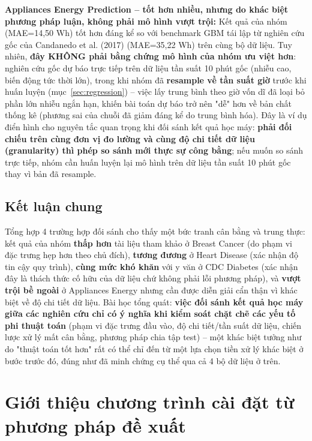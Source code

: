 \textbf{Appliances Energy Prediction -- tốt hơn nhiều, nhưng do khác biệt phương pháp luận, không phải mô hình vượt trội:} Kết quả của nhóm (MAE=14,50 Wh) tốt hơn đáng kể so với benchmark GBM tái lập từ nghiên cứu gốc của Candanedo et al. (2017) (MAE=35,22 Wh) trên cùng bộ dữ liệu. Tuy nhiên, \textbf{đây KHÔNG phải bằng chứng mô hình của nhóm ưu việt hơn}: nghiên cứu gốc dự báo trực tiếp trên dữ liệu tần suất 10 phút gốc (nhiễu cao, biến động tức thời lớn), trong khi nhóm đã \textbf{resample về tần suất giờ} trước khi huấn luyện (mục~\ref{sec:regression}) -- việc lấy trung bình theo giờ vốn dĩ đã loại bỏ phần lớn nhiễu ngắn hạn, khiến bài toán dự báo trở nên "dễ" hơn về bản chất thống kê (phương sai của chuỗi đã giảm đáng kể do trung bình hóa). Đây là ví dụ điển hình cho nguyên tắc quan trọng khi đối sánh kết quả học máy: \textbf{phải đối chiếu trên cùng đơn vị đo lường và cùng độ chi tiết dữ liệu (granularity) thì phép so sánh mới thực sự công bằng}; nếu muốn so sánh trực tiếp, nhóm cần huấn luyện lại mô hình trên dữ liệu tần suất 10 phút gốc thay vì bản đã resample.

\subsection{Kết luận chung}

Tổng hợp 4 trường hợp đối sánh cho thấy một bức tranh cân bằng và trung thực: kết quả của nhóm \textbf{thấp hơn} tài liệu tham khảo ở Breast Cancer (do phạm vi đặc trưng hẹp hơn theo chủ đích), \textbf{tương đương} ở Heart Disease (xác nhận độ tin cậy quy trình), \textbf{cùng mức khó khăn} với y văn ở CDC Diabetes (xác nhận đây là thách thức cố hữu của dữ liệu chứ không phải lỗi phương pháp), và \textbf{vượt trội bề ngoài} ở Appliances Energy nhưng cần được diễn giải cẩn thận vì khác biệt về độ chi tiết dữ liệu. Bài học tổng quát: \textbf{việc đối sánh kết quả học máy giữa các nghiên cứu chỉ có ý nghĩa khi kiểm soát chặt chẽ các yếu tố phi thuật toán} (phạm vi đặc trưng đầu vào, độ chi tiết/tần suất dữ liệu, chiến lược xử lý mất cân bằng, phương pháp chia tập test) -- một khác biệt tưởng như do "thuật toán tốt hơn" rất có thể chỉ đến từ một lựa chọn tiền xử lý khác biệt ở bước trước đó, đúng như đã minh chứng cụ thể qua cả 4 bộ dữ liệu ở trên.

\section{Giới thiệu chương trình cài đặt từ phương pháp đề xuất}

